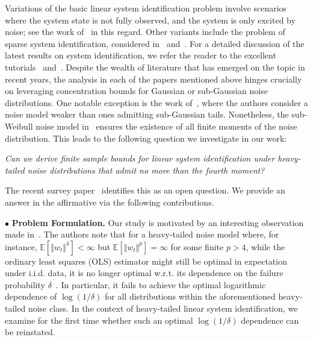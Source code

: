 \documentclass[letterpaper, 11 pt]{article}
\begin{document}
Variations of the basic linear system identification problem involve scenarios where the system state is not fully observed, and the system is only excited by noise; see the work of~\cite{tsiamis2019finite} in this regard. Other variants include the problem of sparse system identification, considered in~\cite{fattahi2019learning} and~\cite{sun2020finite}. For a detailed discussion of the latest results on system identification, we refer the reader to the excellent tutorials~\cite{tsiamis2023statistical} and~\cite{ziemann2023tutorial}. Despite the wealth of literature that has emerged on the topic in recent years, the analysis in each of the papers mentioned above hinges crucially on leveraging concentration bounds for Gaussian or sub-Gaussian noise distributions. One notable exception is the work of~\cite{faradonbeh2018finite}, where the authors consider a noise model weaker than ones admitting sub-Gaussian tails. Nonetheless, the sub-Weibull noise model in~\cite{faradonbeh2018finite} ensures the existence of all finite moments of the noise distribution. This leads to the following question we investigate in our work: 

\textit{Can we derive finite sample bounds for linear system identification under heavy-tailed noise distributions that admit no more than the fourth moment?}

The recent survey paper~\cite{tsiamis2023statistical} identifies this as an open question. We provide an answer in the affirmative via the following contributions.

$\bullet$ \textbf{Problem Formulation.} Our study is motivated by an interesting observation made in~\cite{tsiamis2023statistical}. The authors note that for a heavy-tailed noise model where, for instance, $\mathbb{E}[\Vert w_t \Vert^4] < \infty$ but $\mathbb{E}[\Vert w_t \Vert^p] = \infty$ for some finite $p >4$, while the ordinary least squares (OLS) estimator might still be optimal in expectation under i.i.d. data, it is no longer optimal w.r.t. its dependence on the failure probability $\delta$~\cite{oliveira2016lower}. In particular, it fails to achieve the optimal logarithmic dependence of $\log(1/\delta)$ for all distributions within the aforementioned heavy-tailed noise class. In the context of heavy-tailed linear system identification, we examine for the first time whether such an optimal $\log(1/\delta)$ dependence can be reinstated. 
\end{document}
